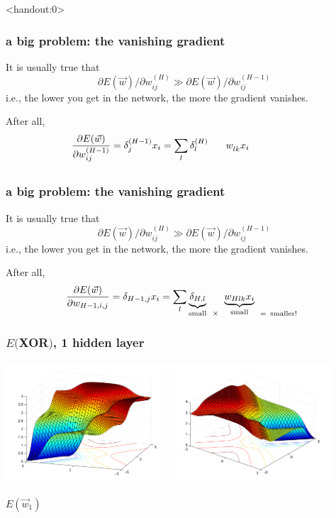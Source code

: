 \documentclass[USenglish,pdftex,compress,10pt,svgnamesi,handout]{beamer}
\newcommand{\bfw}{\Vec{w}}
\def\hid{{H}}
\begin{document}
\def\i#1{\textcolor{white}{#1}}

\begin{frame}<handout:0>
\frametitle{a big problem: the vanishing gradient}
It is usually true that 
$$  \partial E(\bfw) / \partial w_{ij}^{(\hid)}
  \gg
    \partial E(\bfw) / \partial w_{ij}^{(\hid-1)}
$$
i.e., the lower you get in the network, the more the gradient vanishes.

After all,
$$
{\partial E(\bfw)  \over \partial w_{ij}^{(\hid-1)} }
    = \delta^{(\hid-1)}_j x_i 
    = \sum_l \i{\underbrace{\textcolor{black}{\delta_l^{(\hid)}}}_{\mathrm{small}}}
    	\i{\underbrace{{}_l^(}_{\i{\times}}}
	\i{\underbrace{ \textcolor{black}{w_{lk}^{\i(} x_i }}_{\mathrm{small}}}
	\i{\underbrace{=smaller_l^(}_{=\,\,\,\mathrm{smaller!}}} 
$$\end{frame}

\begin{frame}
\frametitle{a big problem: the vanishing gradient}
It is usually true that 
$$  \partial E(\bfw) / \partial w_{ij}^{(\hid)}
  \gg
    \partial E(\bfw) / \partial w_{ij}^{(\hid-1)}
$$
i.e., the lower you get in the network, the more the gradient vanishes.

After all,
$$
{\partial E(\bfw)  \over \partial w_{\hid-1,i,j} }
    = \delta_{\hid-1,j} x_i 
    = \sum_l {\underbrace{\textcolor{black}{\delta_{\hid,l}}}_{\mathrm{small}}}
    	\i{\underbrace{{}_l^(}_{\textcolor{black}{\times}}}
	{\underbrace{ \textcolor{black}{w_{Hlk} x_i }}_{\mathrm{small}}}
	\i{\underbrace{=smaller_l^(}_{\textcolor{black}{=\,\,\,\mathrm{smaller!}}}}
$$\end{frame}







\begin{frame}
\frametitle{$E($XOR$)$, 1 hidden layer}
\includegraphics[width=6cm]{pics/xor_in1_1hidden}
\includegraphics[width=6cm]{pics/xor_in2_1hidden}

$E(\Vec w_1)$
\end{frame}
\end{document}
